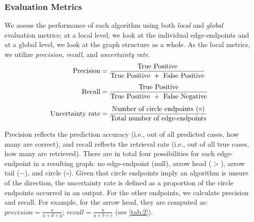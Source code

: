 \documentclass[twoside, 11pt]{article}
\begin{document}
\subsubsection{Evaluation Metrics}
We assess the performance of each algorithm using both \textit{local} and \textit{global} evaluation metrics; at a local level, we look at the individual edge-endpoints and at a global level, we look at the graph structure as a whole. As the local metrics, we utilize \textit{precision}, \textit{recall}, and \textit{uncertainty rate}. 
\begin{align*}
\text{Precision} &= \frac{\text{True Positive}}{\text{True Positive } + \text{ False Positive}} \vspace{1mm} \\[1.1ex]
\text{Recall} &= \frac{\text{True Positive}}{\text{True Positive } + \text{ False Negative}} \\[1.1ex]
\text{Uncertainty rate} &= \frac{\text{Number of circle endpoints } (\circ)}{\text{Total number of edge-endpoints}}
\end{align*}

\noindent Precision reflects the prediction accuracy (i.e., out of all predicted cases, how many are correct), and recall reflects the retrieval rate (i.e., out of all true cases, how many are retrieved). There are in total four possibilities for each edge-endpoint in a resulting graph: no edge-endpoint (null), arrow head ($>$), arrow tail ($-$), and circle ($\circ$). Given that circle endpoints imply an algorithm is unsure of the direction, the uncertainty rate is defined as a proportion of the circle endpoints occurred in an output.
For the other endpoints, we calculate precision and recall. For example, for the arrow head, they are computed as: $precision =  \frac{a}{a + d + g}$; $recall = \frac{a}{a + b + c}$ (see \autoref{tab:2}).
\end{document}
